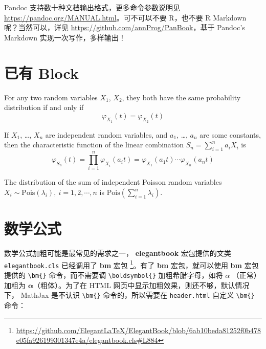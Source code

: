 \documentclass[
  lang=cn,
  11pt,
  scheme=chinese,
  chinesefont=nofont,
  citestyle=gb7714-2015,
  bibstyle=gb7714-2015]{elegantbook}
\begin{document}
Pandoc 支持数十种文档输出格式，更多命令参数说明见 \url{https://pandoc.org/MANUAL.html}。可不可以不要 R，也不要 R Markdown 呢？当然可以，详见 \url{https://github.com/annProg/PanBook}，基于 Pandoc's Markdown 实现一次写作，多样输出！

\hypertarget{theorem-block}{%
\section{已有 Block}\label{theorem-block}}

\begin{lemma}
\protect\hypertarget{lem:chf-pdf}{}\label{lem:chf-pdf}For any two random variables \(X_1\), \(X_2\), they both have the same probability distribution if and only if \[\varphi _{X_1}(t)=\varphi _{X_2}(t)\]
\end{lemma}

\begin{theorem}
\protect\hypertarget{thm:chf-sum}{}\label{thm:chf-sum}If \(X_1\), \ldots, \(X_n\) are independent random variables, and \(a_1\), \ldots, \(a_n\) are some constants, then the characteristic function of the linear combination \(S_n=\sum_{i=1}^na_iX_i\) is \[\varphi _{S_{n}}(t)=\prod_{i=1}^n\varphi _{X_i}(a_{i}t)=\varphi _{X_{1}}(a_{1}t)\cdots \varphi _{X_{n}}(a_{n}t)\]
\end{theorem}

\begin{proposition}
\protect\hypertarget{prp:unnamed-chunk-4}{}\label{prp:unnamed-chunk-4}The distribution of the sum of independent Poisson random variables \(X_i \sim \mathrm{Pois}(\lambda_i),\: i=1,2,\cdots,n\) is \(\mathrm{Pois}(\sum_{i=1}^n\lambda_i)\).
\end{proposition}

\hypertarget{math-formular}{%
\section{数学公式}\label{math-formular}}

数学公式加粗可能是最常见的需求之一， \textbf{elegantbook} 宏包提供的文类 \texttt{elegantbook.cls} 已经调用了 \textbf{bm} 宏包 \footnote{\url{https://github.com/ElegantLaTeX/ElegantBook/blob/6ab10beda81252f0b478e05fa926199301347e4a/elegantbook.cls\#L884}}。有了 \textbf{bm} 宏包，就可以使用 \textbf{bm} 宏包提供的 \texttt{\textbackslash{}bm\{\}} 命令，而不需要调 \texttt{\textbackslash{}boldsymbol\{\}} 加粗希腊字母，如将 \(\alpha\) （正常）加粗为 \(\bm{\alpha}\)（粗体）。为了在 HTML 网页中显示加粗效果，则还不够，默认情况下， MathJax 是不认识 \texttt{\textbackslash{}bm\{\}} 命令的，所以需要在 \texttt{header.html} 自定义 \texttt{\textbackslash{}bm\{\}} 命令：
\end{document}
